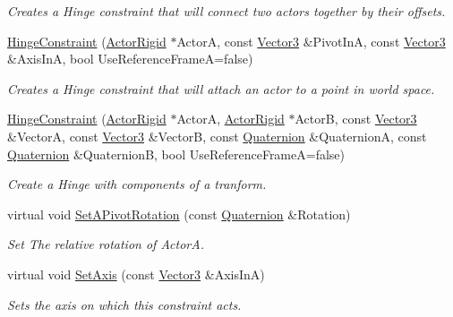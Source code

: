 \begin{DoxyCompactItemize}
\begin{DoxyCompactList}\small\item\em Creates a Hinge constraint that will connect two actors together by their offsets. \item\end{DoxyCompactList}\item 
\hyperlink{classMezzanine_1_1HingeConstraint_acb7f380b212a396b92d78ac055c55a68}{HingeConstraint} (\hyperlink{classMezzanine_1_1ActorRigid}{ActorRigid} $\ast$ActorA, const \hyperlink{classMezzanine_1_1Vector3}{Vector3} \&PivotInA, const \hyperlink{classMezzanine_1_1Vector3}{Vector3} \&AxisInA, bool UseReferenceFrameA=false)
\begin{DoxyCompactList}\small\item\em Creates a Hinge constraint that will attach an actor to a point in world space. \item\end{DoxyCompactList}\item 
\hyperlink{classMezzanine_1_1HingeConstraint_a62a733c3ad51d3e7c5f51ae5a8adadd0}{HingeConstraint} (\hyperlink{classMezzanine_1_1ActorRigid}{ActorRigid} $\ast$ActorA, \hyperlink{classMezzanine_1_1ActorRigid}{ActorRigid} $\ast$ActorB, const \hyperlink{classMezzanine_1_1Vector3}{Vector3} \&VectorA, const \hyperlink{classMezzanine_1_1Vector3}{Vector3} \&VectorB, const \hyperlink{classMezzanine_1_1Quaternion}{Quaternion} \&QuaternionA, const \hyperlink{classMezzanine_1_1Quaternion}{Quaternion} \&QuaternionB, bool UseReferenceFrameA=false)
\begin{DoxyCompactList}\small\item\em Create a Hinge with components of a tranform. \item\end{DoxyCompactList}\item 
virtual void \hyperlink{classMezzanine_1_1HingeConstraint_aa38c63cb80624e1e26043cf84e5c01c2}{SetAPivotRotation} (const \hyperlink{classMezzanine_1_1Quaternion}{Quaternion} \&Rotation)
\begin{DoxyCompactList}\small\item\em Set The relative rotation of ActorA. \item\end{DoxyCompactList}\item 
virtual void \hyperlink{classMezzanine_1_1HingeConstraint_a4c8bbe6e1d7f1fec78b1e8b0296ad61f}{SetAxis} (const \hyperlink{classMezzanine_1_1Vector3}{Vector3} \&AxisInA)
\begin{DoxyCompactList}\small\item\em Sets the axis on which this constraint acts. \item\end{DoxyCompactList}\item 

\end{DoxyCompactItemize}
